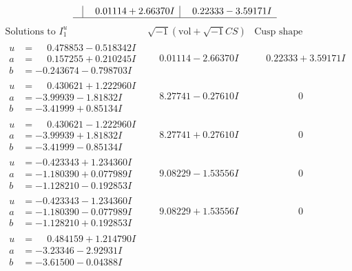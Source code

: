 \documentclass[1p]{elsarticle_modified}
\theoremstyle{definition}
\newcommand{\I}{\sqrt{-1}}
\begin{document}
$$\begin{array}{c|c|c}
 & \phantom{-}0.01114 + 2.66370 I & \phantom{-}0.22333 - 3.59171 I\\
 \hline 
 \end{array}$$\newpage$$\begin{array}{c|c|c}  
\text{Solutions to }I^u_{1}& \I (\text{vol} + \sqrt{-1}CS) & \text{Cusp shape}\\
 \hline 
\begin{aligned}
u &= \phantom{-}0.478853 - 0.518342 I \\
a &= \phantom{-}0.157255 + 0.210245 I \\
b &= -0.243674 - 0.798703 I\end{aligned}
 & \phantom{-}0.01114 - 2.66370 I & \phantom{-}0.22333 + 3.59171 I \\ \hline\begin{aligned}
u &= \phantom{-}0.430621 + 1.222960 I \\
a &= -3.99939 - 1.81832 I \\
b &= -3.41999 + 0.85134 I\end{aligned}
 & \phantom{-}8.27741 - 0.27610 I & \phantom{-0.000000 } 0 \\ \hline\begin{aligned}
u &= \phantom{-}0.430621 - 1.222960 I \\
a &= -3.99939 + 1.81832 I \\
b &= -3.41999 - 0.85134 I\end{aligned}
 & \phantom{-}8.27741 + 0.27610 I & \phantom{-0.000000 } 0 \\ \hline\begin{aligned}
u &= -0.423343 + 1.234360 I \\
a &= -1.180390 + 0.077989 I \\
b &= -1.128210 - 0.192853 I\end{aligned}
 & \phantom{-}9.08229 - 1.53556 I & \phantom{-0.000000 } 0 \\ \hline\begin{aligned}
u &= -0.423343 - 1.234360 I \\
a &= -1.180390 - 0.077989 I \\
b &= -1.128210 + 0.192853 I\end{aligned}
 & \phantom{-}9.08229 + 1.53556 I & \phantom{-0.000000 } 0 \\ \hline\begin{aligned}
u &= \phantom{-}0.484159 + 1.214790 I \\
a &= -3.23346 - 2.92931 I \\
b &= -3.61500 - 0.04388 I\end{aligned}

\end{array}$$
\end{document}
